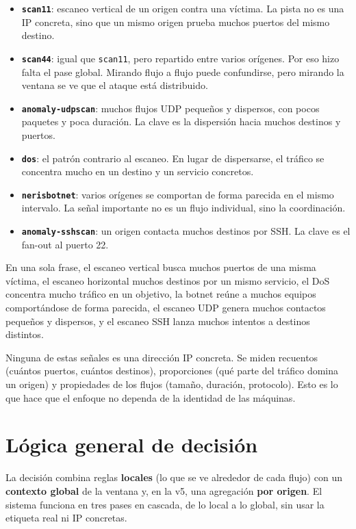 \begin{itemize}
  \item \textbf{\texttt{scan11}}: escaneo vertical de un origen contra una víctima. La pista no es una IP concreta, sino que un mismo origen prueba muchos puertos del mismo destino.
  \item \textbf{\texttt{scan44}}: igual que \texttt{scan11}, pero repartido entre varios orígenes. Por eso hizo falta el pase global. Mirando flujo a flujo puede confundirse, pero mirando la ventana se ve que el ataque está distribuido.
  \item \textbf{\texttt{anomaly-udpscan}}: muchos flujos UDP pequeños y dispersos, con pocos paquetes y poca duración. La clave es la dispersión hacia muchos destinos y puertos.
  \item \textbf{\texttt{dos}}: el patrón contrario al escaneo. En lugar de dispersarse, el tráfico se concentra mucho en un destino y un servicio concretos.
  \item \textbf{\texttt{nerisbotnet}}: varios orígenes se comportan de forma parecida en el mismo intervalo. La señal importante no es un flujo individual, sino la coordinación.
  \item \textbf{\texttt{anomaly-sshscan}}: un origen contacta muchos destinos por SSH. La clave es el fan-out al puerto 22.
\end{itemize}

En una sola frase, el escaneo vertical busca muchos puertos de una misma víctima, el escaneo horizontal muchos destinos por un mismo servicio, el DoS concentra mucho tráfico en un objetivo, la botnet reúne a muchos equipos comportándose de forma parecida, el escaneo UDP genera muchos contactos pequeños y dispersos, y el escaneo SSH lanza muchos intentos a destinos distintos.

Ninguna de estas señales es una dirección IP concreta. Se miden recuentos (cuántos puertos, cuántos destinos), proporciones (qué parte del tráfico domina un origen) y propiedades de los flujos (tamaño, duración, protocolo). Esto es lo que hace que el enfoque no dependa de la identidad de las máquinas.

\section{Lógica general de decisión}
\label{sec:alg_logica}

La decisión combina reglas \textbf{locales} (lo que se ve alrededor de cada flujo) con un \textbf{contexto global} de la ventana y, en la v5, una agregación \textbf{por origen}. El sistema funciona en tres pases en cascada, de lo local a lo global, sin usar la etiqueta real ni IP concretas.

